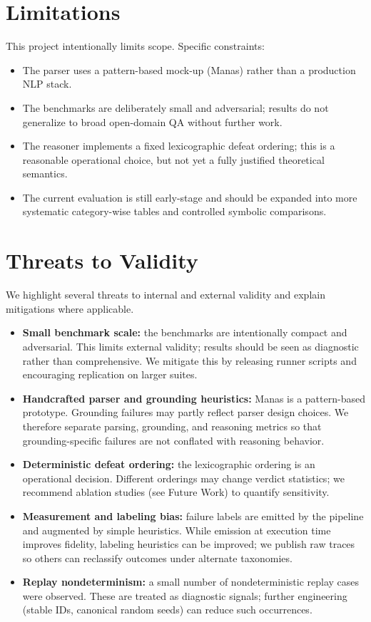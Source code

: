 \documentclass[11pt]{article}
\begin{document}
\section{Limitations}
This project intentionally limits scope. Specific constraints:
\begin{itemize}
  \item The parser uses a pattern-based mock-up (Manas) rather than a production NLP stack.
  \item The benchmarks are deliberately small and adversarial; results do not generalize
    to broad open-domain QA without further work.
  \item The reasoner implements a fixed lexicographic defeat ordering; this is a
    reasonable operational choice, but not yet a fully justified theoretical semantics.
  \item The current evaluation is still early-stage and should be expanded into more
    systematic category-wise tables and controlled symbolic comparisons.
\end{itemize}

\section{Threats to Validity}
We highlight several threats to internal and external validity and explain mitigations
where applicable.
\begin{itemize}
  \item \textbf{Small benchmark scale:} the benchmarks are intentionally compact and
    adversarial. This limits external validity; results should be seen as diagnostic
    rather than comprehensive. We mitigate this by releasing runner scripts and
    encouraging replication on larger suites.
  \item \textbf{Handcrafted parser and grounding heuristics:} Manas is a pattern-based
    prototype. Grounding failures may partly reflect parser design choices. We therefore
    separate parsing, grounding, and reasoning metrics so that grounding-specific
    failures are not conflated with reasoning behavior.
  \item \textbf{Deterministic defeat ordering:} the lexicographic ordering is an
    operational decision. Different orderings may change verdict statistics; we
    recommend ablation studies (see Future Work) to quantify sensitivity.
  \item \textbf{Measurement and labeling bias:} failure labels are emitted by the
    pipeline and augmented by simple heuristics. While emission at execution time
    improves fidelity, labeling heuristics can be improved; we publish raw traces so
    others can reclassify outcomes under alternate taxonomies.
  \item \textbf{Replay nondeterminism:} a small number of nondeterministic replay
    cases were observed. These are treated as diagnostic signals; further engineering
    (stable IDs, canonical random seeds) can reduce such occurrences.
\end{itemize}
\end{document}
